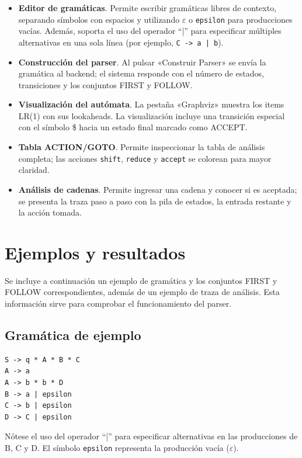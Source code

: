 \documentclass[12pt,a4paper]{article}
\begin{document}
\begin{itemize}
  \item \textbf{Editor de gramáticas}.  Permite escribir gramáticas libres de contexto, separando símbolos con espacios y utilizando $\varepsilon$ o \texttt{epsilon} para producciones vacías.  Además, soporta el uso del operador ``|'' para especificar múltiples alternativas en una sola línea (por ejemplo, \texttt{C -> a | b}).
  \item \textbf{Construcción del parser}.  Al pulsar «Construir Parser» se envía la gramática al backend; el sistema responde con el número de estados, transiciones y los conjuntos FIRST y FOLLOW.
  \item \textbf{Visualización del autómata}.  La pestaña «Graphviz» muestra los items LR(1) con sus lookaheads.  La visualización incluye una transición especial con el símbolo \$ hacia un estado final marcado como ACCEPT.
  \item \textbf{Tabla ACTION/GOTO}.  Permite inspeccionar la tabla de análisis completa; las acciones \texttt{shift}, \texttt{reduce} y \texttt{accept} se colorean para mayor claridad.
  \item \textbf{Análisis de cadenas}.  Permite ingresar una cadena y conocer si es aceptada; se presenta la traza paso a paso con la pila de estados, la entrada restante y la acción tomada.
\end{itemize}

\section{Ejemplos y resultados}

Se incluye a continuación un ejemplo de gramática y los conjuntos FIRST y FOLLOW correspondientes, además de un ejemplo de traza de análisis.  Esta información sirve para comprobar el funcionamiento del parser.

\subsection{Gramática de ejemplo}

\begin{verbatim}
S -> q * A * B * C
A -> a
A -> b * b * D
B -> a | epsilon
C -> b | epsilon
D -> C | epsilon
\end{verbatim}

Nótese el uso del operador ``|'' para especificar alternativas en las producciones de B, C y D. El símbolo \texttt{epsilon} representa la producción vacía ($\varepsilon$).
\end{document}
